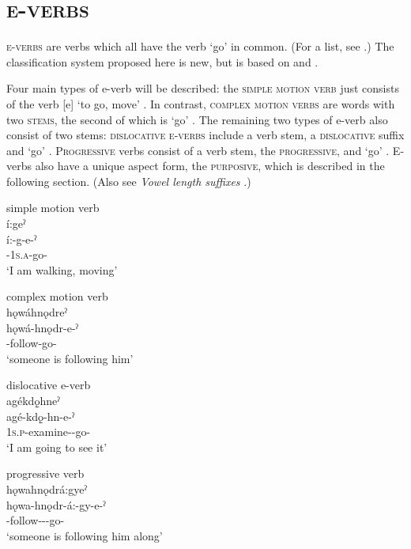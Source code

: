 \chapter{\textsc{e-verbs}} \label{ch:E-verbs}
\textsc{e-verbs} are verbs which all have the verb  ‘go’ in common. (For a list, see .) The classification system proposed here is new, but is based on \citet{michelson_ontario_2011} and \citet{sasse_far_1998}. 

Four main types of e-verb will be described: the \textsc{simple motion verb} just consists of the verb [e] ‘to go, move’ . In contrast, \textsc{complex motion verbs} are words with two \textsc{stems}, the second of which is  ‘go’ . The remaining two types of e-verb also consist of two stems: \textsc{dislocative e-verbs} include a verb stem, a \textsc{dislocative} suffix and  ‘go’ . \textsc{Progressive} verbs consist of a verb stem, the  \textsc{progressive}, and  ‘go’ . E-verbs also have a unique aspect form, the \stem{-:} \textsc{purposive}, which is described in the following section. (Also see \textit{Vowel length suffixes} .)

\ea\label{ex:motverbex} simple motion verb \\
í:geˀ\\
\gll í:-g-e-ˀ\\
 {\prothetic}-\textsc{1s.a}-go-{\aspect}\\
\glt `I am walking, moving'
\z


\ea\label{ex:motverbex2} complex motion verb \\
hǫwáhnǫdreˀ\\
\gll hǫwá-hnǫdr-e-ˀ\\
 -follow-go-{\aspect}\\
\glt `someone is following him'
\z




\ea\label{ex:motverbex3} dislocative e-verb \\
agékdǫ̱hneˀ\\
\gll agé-kdǫ̱-hn-e-ˀ\\
 \textsc{1s.p}-examine-{\dislocative}-go-{\aspect}\\
\glt `I am going to see it'
\z


\newpage
\ea\label{ex:motverbex4} progressive verb \\
hǫwahnǫdrá:gyeˀ\\
\gll hǫwa-hnǫdr-á:-gy-e-ˀ\\
 -follow-{\joinerA}-{\progressive}-go-{\aspect}\\
\glt `someone is following him along'
\z



